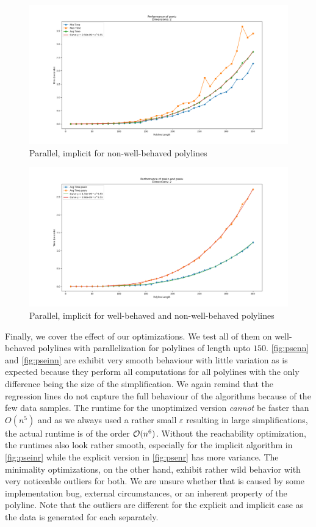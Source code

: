 \begin{figure}[ht]
  \centering
  \includegraphics[scale=0.5, width=\linewidth]{figures/pseiu.png}
  \caption{Parallel, implicit for non-well-behaved polylines}
  \label{fig:pseiu}
\end{figure}

\begin{figure}[ht]
  \centering
  \includegraphics[scale=0.5, width=\linewidth]{figures/psein-pseiu.png}
  \caption{Parallel, implicit for well-behaved and non-well-behaved polylines}
  \label{fig:psein-pseiu}
\end{figure}

Finally, we cover the effect of our optimizations. We test all of them on well-behaved polylines with parallelization for polylines of length upto \(150\).
\cref{fig:psenn} and \cref{fig:pseinn} are exhibit very smooth behaviour with little variation as is expected because they perform all computations for all polylines with the only difference being the size of the simplification. We again remind that the regression lines do not capture the full behaviour of the algorithms because of the few data samples. The runtime for the unoptimized version \emph{cannot} be faster than \(O(n^5)\) and as we always used a rather small \(\varepsilon\) resulting in large simplifications, the actual runtime is of the order \(\mathcal{O}(n^6)\).
Without the reachability optimization, the runtimes also look rather smooth, especially for the implicit algorithm in \cref{fig:pseinr} while the explicit version in \cref{fig:psenr} has more variance.  
The minimality optimizations, on the other hand, exhibit rather wild behavior with very noticeable outliers for both. We are unsure whether that is caused by some implementation bug, external circumstances, or an inherent property of the polyline. Note that the outliers are different for the explicit and implicit case as the data is generated for each separately. 

